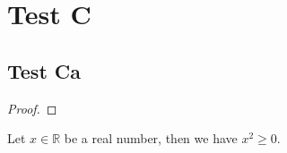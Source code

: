 \documentclass{amsart}
\begin{document}
\section{Test C}
\subsection{Test Ca}
\begin{proof}
\end{proof}
Let $x\in\mathbb R$ be a real number, then we have $x^2\ge0$.
\end{document}
